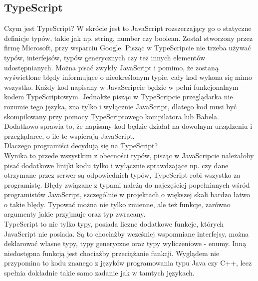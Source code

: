 \documentclass[12pt]{article}
\begin{document}
\begin{sloppypar}
{  \subsection{TypeScript}
  {
    Czym jest TypeScript? W skrócie jest to JavaScript rozszerzający go o statyczne definicje typów, takie jak np. string, number czy boolean. 
    Został stworzony przez firmę Microsoft, przy wsparciu Google.
    Pisząc w TypeScripcie nie trzeba używać typów, interfejsów, typów generycznych czy też innych elementów udostępnianych. 
    Można pisać zwykły JavaScript i pomimo, że zostaną wyświetlone błędy informujące o nieokreślonym typie, cały kod wykona się mimo wszystko.
    Każdy kod napisany w JavaScripcie będzie w pełni funkcjonalnym kodem TypeScriptowym.
    Jednakże pisząc w TypeScripcie przeglądarka nie rozumie tego języka, zna tylko i wyłącznie JavaScript, dlatego kod musi być skompilowany przy pomocy 
    TypeScriptowego kompilatora lub Babela.\cite{typescript-docs} 
    Dodatkowo sprawia to, że napisany kod będzie działał na dowolnym urządzeniu i przeglądarce, o ile te wspierają JavaScript.\\
    Dlaczego programiści decydują się na TypeScript?\\
    Wynika to przede wszystkim z obecności typów, pisząc w JavaScripcie należałoby pisać dodatkowe linijki kodu tylko i wyłącznie sprawdzające np. czy 
    dane otrzymane przez serwer są odpowiednich typów, TypeScript robi wszystko za programistę. 
    Błędy związane z typami należą do najczęściej popełnianych wśród programistów JavaScript, szczególnie w projektach o większej skali bardzo łatwo o takie błędy.
    Typować można nie tylko zmienne, ale też funkcje, zarówno argumenty jakie przyjmuje oraz typ zwracany.\\
    TypeScript to nie tylko typy, posiada liczne dodatkowe funkcje, których JavaScript nie posiada. Są to chociażby wcześniej wspomniane interfejsy, 
    można deklarować własne typy, typy generyczne oraz typy wyliczeniowe - enumy. Inną niedostępna funkcją jest chociażby przeciążanie funkcji. 
    Wyglądem nie przypomina to kodu znanego z języków programowania typu Java czy C++, lecz spełnia dokładnie takie samo zadanie jak w tamtych językach.
  }
}
\end{sloppypar}
\end{document}
